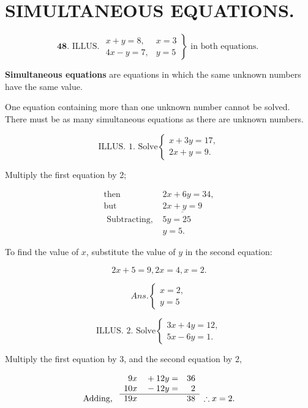 \documentclass{book}
\begin{document}
\section*{SIMULTANEOUS EQUATIONS.}

\[
\textbf{48. } \textrm{ILLUS. } \left. \begin{array}{cc} x + y = 8, & x=3\\
4x-y=7, & y=5 \end{array} \right\} \textrm{ in both equations. }
\]

\textbf{Simultaneous equations} are equations in which the
same unknown numbers have the same value.

One equation containing more than one unknown
number cannot be solved. There must be as many
simultaneous equations as there are unknown numbers.

\[
 \textrm{ILLUS. 1.  Solve} \left\{ \begin{array}{c} x + 3y = 17,\\
2x+y=9. \end{array} \right.
\]

Multiply the first equation by 2;

\[
 \left. \begin{array}{cc} \textrm{then} & 2x + 6y = 34, \\
\textrm{but} & \underline{2x+y=9}\\
\textrm{  Subtracting, } & 5y=25\\
& y=5. \end{array} \right.
\]

To find the value of $x$, substitute the value of $y$ in the
second equation:

\[
2x + 5 = 9, 2x = 4, x = 2.
\]

\[
 Ans. \left\{ \begin{array}{l} x = 2,\\
y=5 \end{array} \right.
\]

\[
 \textrm{ILLUS. 2.  Solve} \left\{ \begin{array}{c} 3x + 4y = 12,\\
5x - 6y=1. \end{array} \right.
\]

Multiply the first equation by 3, and the second equation
by 2,

\[ \begin{array}{l rrr l}
                &  9x & {}+ 12y = & 36   \\
                & 10x & {}- 12y = &  2   \\
\cline{2-4} \text{Adding, } & 19x &           & 38 & \therefore x
= 2.
\end{array}
\]
\end{document}

